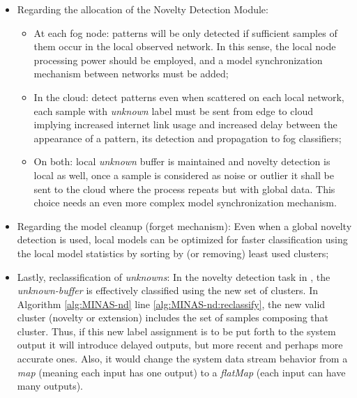 \begin{itemize}
  \item Regarding the allocation of the Novelty Detection Module:
  \begin{itemize}
    
    \item At each fog node: patterns will be only detected if sufficient samples
    of them occur in the local observed network. In this sense, the local node
    processing power should be employed, and a model synchronization mechanism between networks
    must be added;
    \item In the cloud: detect patterns even when scattered on each local
    network, each sample with \emph{unknown} label must be sent from edge to
    cloud implying increased internet link usage and increased delay between the
    appearance of a pattern, its detection and propagation to fog classifiers;

    \item On both: local \emph{unknown} buffer is maintained and novelty
    detection is local as well, once a sample is considered as noise or outlier
    it shall be sent to the cloud where the process repeats but with global
    data.
    This choice needs an even more complex model synchronization mechanism.

  \end{itemize}
    
  \item Regarding the model cleanup (forget mechanism): Even when a global
  novelty detection is used, local models can be optimized for faster
  classification using the local model statistics by sorting by (or removing)
  least used clusters;

  \item Lastly, reclassification of \emph{unknowns}: In the novelty detection
  task in \minas, the \emph{unknown-buffer} is effectively classified
  using the new set of clusters.
  In Algorithm \ref{alg:MINAS-nd} line \ref{alg:MINAS-nd:reclassify}, the
  new valid cluster (novelty or extension) includes the set of samples composing
  that cluster. Thus, if this new label assignment is to be put forth to the system
  output it will introduce delayed outputs, but more recent and perhaps more
  accurate ones. %
  Also, it would change the system data stream behavior from a \emph{map}
  (meaning each input has one output) to a \emph{flatMap} (each input can have
  many outputs).

\end{itemize}

